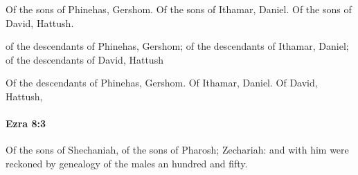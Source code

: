 			\begin{versebox}
					\item[BHS] 
					\item[LXX] 
					\item[ASV] Of the sons of Phinehas, Gershom. Of the sons of Ithamar, Daniel. Of the sons of David, Hattush.
					\item[NIV] of the descendants of Phinehas, Gershom; of the descendants of Ithamar, Daniel; of the descendants of David, Hattush
					\item[NRSV] Of the descendants of Phinehas, Gershom. Of Ithamar, Daniel. Of David, Hattush,
			\end{versebox}

		\paragraph{Ezra 8:3} %
			\label{EZRA-8-3}

			Of the sons of Shechaniah, of the sons of Pharosh; Zechariah: and with him were reckoned by genealogy of the males an hundred and fifty.

